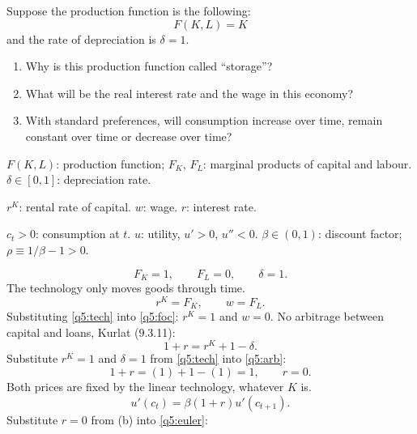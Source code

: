 \noindent Suppose the production function is the following:
\[
F(K,L)=K
\]
and the rate of depreciation is $\delta=1$.
\begin{enumerate}[label=(\alph*),leftmargin=2.2em,topsep=2pt,itemsep=1pt]
\item Why is this production function called ``storage''?
\item What will be the real interest rate and the wage in this economy?
\item With standard preferences, will consumption increase over time, remain constant over time or decrease over time?
\end{enumerate}
\resolespaco
\begin{sol}
\begin{notacao}
\item $F(K,L)$: production function; $F_K$, $F_L$: marginal products of capital and labour. $\delta\in[0,1]$: depreciation rate.
\item $r^K$: rental rate of capital. $w$: wage. $r$: interest rate.
\item $c_t>0$: consumption at $t$. $u$: utility, $u'>0$, $u''<0$. $\beta\in(0,1)$: discount factor; $\rho\equiv1/\beta-1>0$.
\end{notacao}
\begin{equation}
F_K=1,\qquad F_L=0,\qquad \delta=1. \label{q5:tech}
\end{equation}
The technology only moves goods through time.
\begin{equation}
r^K=F_K,\qquad w=F_L. \label{q5:foc}
\end{equation}
Substituting \eqref{q5:tech} into \eqref{q5:foc}: $r^K=1$ and $w=0$. No arbitrage between capital and loans, Kurlat (9.3.11):
\begin{equation}
1+r=r^K+1-\delta. \label{q5:arb}
\end{equation}
Substitute $r^K=1$ and $\delta=1$ from \eqref{q5:tech} into \eqref{q5:arb}:
\[
1+r=(1)+1-(1)=1,\qquad r=0 .
\]
Both prices are fixed by the linear technology, whatever $K$ is.
\begin{equation}
u'(c_t)=\beta(1+r)u'(c_{t+1}). \label{q5:euler}
\end{equation}
Substitute $r=0$ from (b) into \eqref{q5:euler}:
\begin{align*}

\end{align*}
\end{sol}
